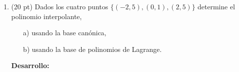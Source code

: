 \documentclass[11pt]{article}
\begin{document}
\begin{enumerate}
\item (20 pt) Dados los cuatro puntos $\{(-2,5),(0,1),(2,5)\}$ determine el polinomio interpolante,
\begin{itemize}
 \item[a)] usando la base can\'onica,
 \item[b)] usando la base de polinomios de Lagrange.
\end{itemize}

\textbf{Desarrollo:}


\end{enumerate}
\end{document}
